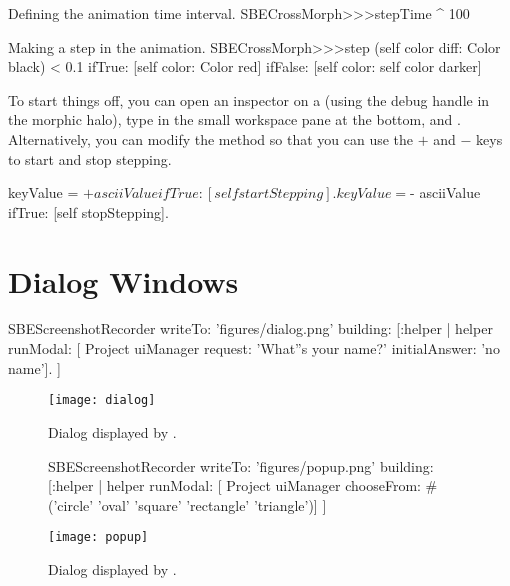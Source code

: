 \documentclass[a4paper,10pt,twoside]{book}
\begin{document}
\begin{method}{Defining the animation time interval.}
SBECrossMorph>>>stepTime
	^ 100
\end{method}
\begin{method}{Making a step in the animation.}
SBECrossMorph>>>step
	(self color diff: Color black) < 0.1
		ifTrue: [self color: Color red]
		ifFalse: [self color: self color darker]
\end{method}
\noindent
To start things off, you can open an inspector on a  (using the debug handle \debugHandle{} in the morphic halo), type  in the small workspace pane at the bottom, and .
Alternatively, you can modify the  method so that you can use the $+$ and $-$ keys to start and stop stepping. 


\begin{code}{}
	keyValue = $+ asciiValue
		ifTrue: [self startStepping].
	keyValue = $- asciiValue
		ifTrue: [self stopStepping].
\end{code}


\section{Dialog Windows}

\begin{ExecuteSmalltalkScript}
SBEScreenshotRecorder writeTo: 'figures/dialog.png' building: [:helper |
	helper runModal: [
		Project uiManager
			request: 'What''s your name?'
			initialAnswer: 'no name'].
]
\end{ExecuteSmalltalkScript}
\begin{figure}[htb]
\begin{minipage}{0.363\textwidth}
	\centerline{\texttt{[image: dialog]}}
	\caption{Dialog displayed by .
		\label{fig:dialogName}}
\end{minipage}
\hfill
\begin{ExecuteSmalltalkScript}
SBEScreenshotRecorder writeTo: 'figures/popup.png' building: [:helper |
	helper runModal: [
		Project uiManager
			chooseFrom: #('circle' 'oval' 'square' 'rectangle' 'triangle')]
]
\end{ExecuteSmalltalkScript}
\begin{minipage}{0.587\textwidth}
	\vfill
	\centerline{\texttt{[image: popup]}}
	\vfill
	\vspace{4ex}
	\caption{Dialog displayed by .}
\end{minipage}
\end{figure}
\end{document}
